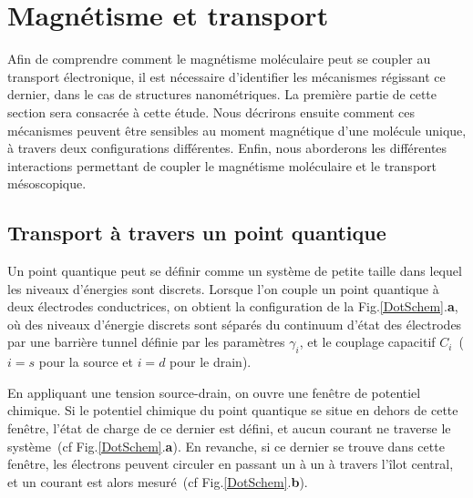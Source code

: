 \section{Magnétisme et transport}
Afin de comprendre comment le magnétisme moléculaire peut se coupler au transport électronique, il est nécessaire d'identifier les mécanismes régissant ce dernier, dans le cas de structures nanométriques. La première partie de cette section sera consacrée à cette étude.
Nous décrirons ensuite comment ces mécanismes peuvent \^etre sensibles au moment magnétique d'une molécule unique, à travers deux configurations différentes. Enfin, nous aborderons les différentes interactions permettant de coupler le magnétisme moléculaire et le transport mésoscopique.

\subsection{Transport à travers un point quantique}
Un point quantique peut se définir comme un système de petite taille dans lequel les niveaux d'énergies sont discrets. Lorsque l'on couple un point quantique à deux électrodes conductrices, on obtient la configuration de la Fig.\ref{DotSchem}.\textbf{a}, où des niveaux d'énergie discrets sont séparés du continuum d'état des électrodes par une barrière tunnel définie par les paramètres $\gamma_i$, et le couplage capacitif $C_i$~($i=s$ pour la source et $i=d$ pour le drain).

En appliquant une tension source-drain, on ouvre une fenêtre de potentiel chimique. Si le potentiel chimique du point quantique se situe en dehors de cette fen\^etre, l'état de charge de ce dernier est défini, et aucun courant ne traverse le système~(cf Fig.\ref{DotSchem}.\textbf{a}). En revanche, si ce dernier se trouve dans cette fen\^etre, les électrons peuvent circuler en passant un à un à travers l'\^ilot central, et un courant est alors mesuré~(cf Fig.\ref{DotSchem}.\textbf{b}). 


